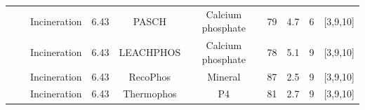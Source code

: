 \documentclass[authoryear]{elsarticle}
\begin{document}
\begin{table}
{\begin{threeparttable}
\begin{tabular}{@{}cccccccccc@{}}
			&                                                                                                                                                         & Incineration                                                                     & 6.43                                      & PASCH                                                                                    & Calcium phosphate                                                                 & 79                                                                                    & 4.7                                  & 6                                                            &     [3,9,10]     \\
			&                                                                                                                                                         & Incineration                                                                     & 6.43                                      & LEACHPHOS                                                                                & Calcium phosphate                                                                 & 78                                                                                    & 5.1                                  & 9                                                            &      [3,9,10]    \\
			&                                                                                                                                                         & Incineration                                                                     & 6.43                                      & RecoPhos                                                                                 & Mineral                                                                           & 87                                                                                    & 2.5                                  & 9                                                            &     [3,9,10]     \\
			&                                                                                                                                                         & Incineration                                                                     & 6.43                                      & Thermophos                                                                               & P4                                                                                & 81                                                                                    & 2.7                                  & 9                                                            &     [3,9,10]     \\ 

\end{tabular}
\end{threeparttable}}
\end{table}
\end{document}
